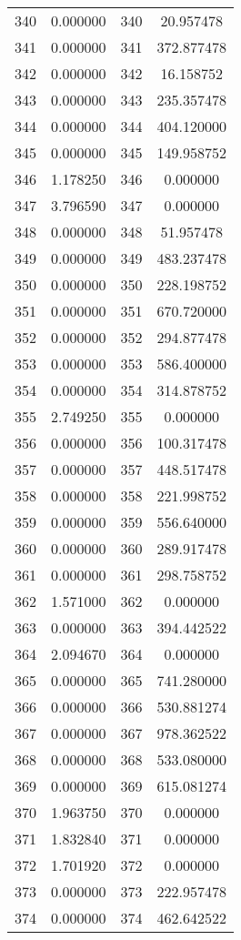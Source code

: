 \documentclass[12pt]{article}
\begin{document}
\begin{longtable}{@{}cccc@{}}
340 & 0.000000 & 340 & 20.957478 \\
341 & 0.000000 & 341 & 372.877478 \\
342 & 0.000000 & 342 & 16.158752 \\
343 & 0.000000 & 343 & 235.357478 \\
344 & 0.000000 & 344 & 404.120000 \\
345 & 0.000000 & 345 & 149.958752 \\
346 & 1.178250 & 346 & 0.000000 \\
347 & 3.796590 & 347 & 0.000000 \\
348 & 0.000000 & 348 & 51.957478 \\
349 & 0.000000 & 349 & 483.237478 \\
350 & 0.000000 & 350 & 228.198752 \\
351 & 0.000000 & 351 & 670.720000 \\
352 & 0.000000 & 352 & 294.877478 \\
353 & 0.000000 & 353 & 586.400000 \\
354 & 0.000000 & 354 & 314.878752 \\
355 & 2.749250 & 355 & 0.000000 \\
356 & 0.000000 & 356 & 100.317478 \\
357 & 0.000000 & 357 & 448.517478 \\
358 & 0.000000 & 358 & 221.998752 \\
359 & 0.000000 & 359 & 556.640000 \\
360 & 0.000000 & 360 & 289.917478 \\
361 & 0.000000 & 361 & 298.758752 \\
362 & 1.571000 & 362 & 0.000000 \\
363 & 0.000000 & 363 & 394.442522 \\
364 & 2.094670 & 364 & 0.000000 \\
365 & 0.000000 & 365 & 741.280000 \\
366 & 0.000000 & 366 & 530.881274 \\
367 & 0.000000 & 367 & 978.362522 \\
368 & 0.000000 & 368 & 533.080000 \\
369 & 0.000000 & 369 & 615.081274 \\
370 & 1.963750 & 370 & 0.000000 \\
371 & 1.832840 & 371 & 0.000000 \\
372 & 1.701920 & 372 & 0.000000 \\
373 & 0.000000 & 373 & 222.957478 \\
374 & 0.000000 & 374 & 462.642522 \\

\end{longtable}
\end{document}
